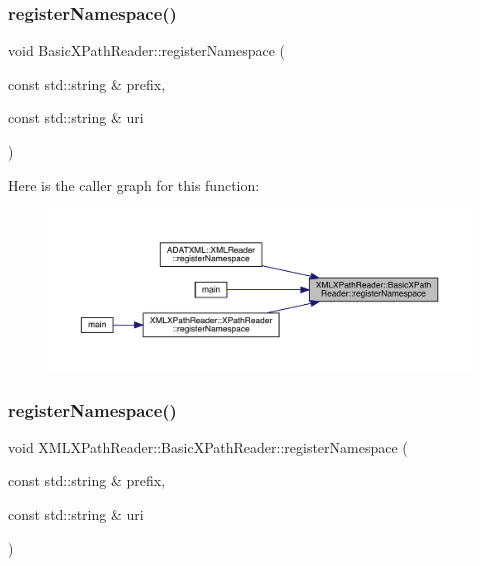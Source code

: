 \subsubsection{\texorpdfstring{registerNamespace()}{registerNamespace()}\hspace{0.1cm}{\footnotesize\ttfamily [1/2]}}
{\footnotesize\ttfamily void Basic\+X\+Path\+Reader\+::register\+Namespace (\begin{DoxyParamCaption}\item[{const std\+::string \&}]{prefix,  }\item[{const std\+::string \&}]{uri }\end{DoxyParamCaption})}

Here is the caller graph for this function\+:\nopagebreak
\begin{figure}[H]
\begin{center}
\leavevmode
\includegraphics[width=350pt]{d6/dbf/classXMLXPathReader_1_1BasicXPathReader_a6c6d6e977694344a70506a24bebe853d_icgraph}
\end{center}
\end{figure}
\mbox{\label{classXMLXPathReader_1_1BasicXPathReader_a5991605f4cda926b146829be5798b037}} 
\subsubsection{\texorpdfstring{registerNamespace()}{registerNamespace()}\hspace{0.1cm}{\footnotesize\ttfamily [2/2]}}
{\footnotesize\ttfamily void X\+M\+L\+X\+Path\+Reader\+::\+Basic\+X\+Path\+Reader\+::register\+Namespace (\begin{DoxyParamCaption}\item[{const std\+::string \&}]{prefix,  }\item[{const std\+::string \&}]{uri }\end{DoxyParamCaption})}

